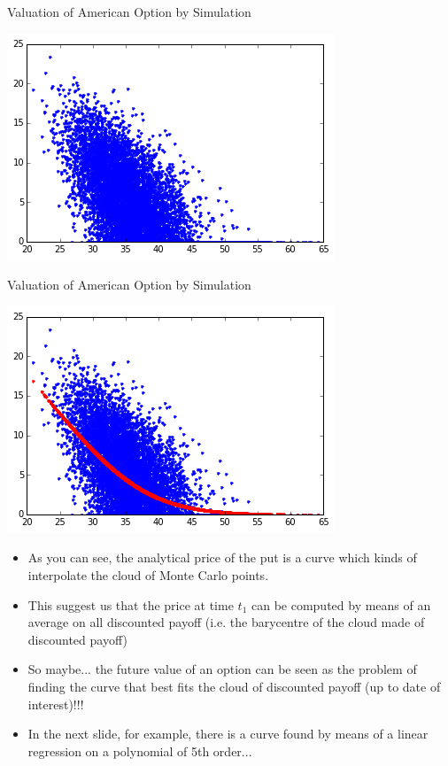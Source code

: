 \documentclass[11pt]{beamer}
\begin{document}
\begin{frame}{Valuation of American Option by Simulation}
\begin{center}
\includegraphics[scale=.8]{img/lsm_1.png} 
\end{center}
\end{frame}
\begin{frame}{Valuation of American Option by Simulation}
\begin{center}
\includegraphics[scale=.8]{img/lsm_2.png} 
\end{center}
\end{frame}
\begin{frame}
\begin{itemize}
\item As you can see, the analytical price of the put is a curve which kinds of interpolate the cloud of Monte Carlo points. \item This suggest us that
the price at time $t_1$ can be computed by means of an average on all discounted payoff (i.e. the barycentre of the cloud made of discounted payoff)
\item So maybe...
the future value of an option can be seen as the problem of finding the curve that best fits the cloud of discounted payoff (up to date of interest)!!!
\item In the next slide, for example, there is a curve found by means of a linear regression on a polynomial of 5th order...
\end{itemize}
\end{frame}
\end{document}
